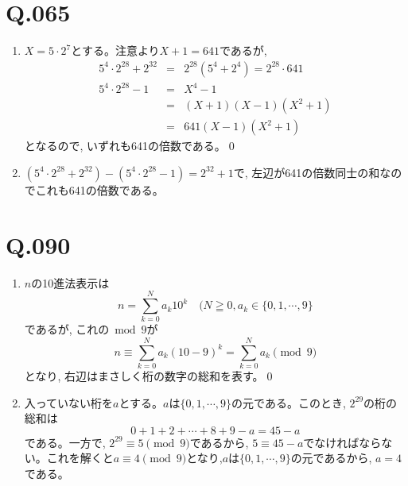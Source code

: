 \documentclass[twocolumn]{jbook}
\theoremstyle{definition}
\newcommand{\disp}{\displaystyle}
\newcommand{\ben}{\begin{enumerate}}
\newcommand{\een}{\end{enumerate}}
\newcommand{\beqn}{\begin{eqnarray*}}
\newcommand{\eeqn}{\end{eqnarray*}}
\renewcommand{\geq}{\geqq}
\begin{document}
\section*{Q.065}
\ben
\item $X=5\cdot 2^{7}$とする。注意より$X+1=641$であるが, 
\beqn
5^{4}\cdot 2^{28} + 2^{32} &=& 2^{28}(5^4+2^4)=2^{28}\cdot 641\\
5^{4}\cdot 2^{28}-1 &=& X^4-1 \\
&=& (X+1)(X-1)(X^2+1)\\
&=&641(X-1)(X^2+1)
\eeqn
となるので, いずれも641の倍数である。\qed
\item $(5^4\cdot 2^{28}+2^{32}) - (5^4\cdot 2^{28} -1) = 2^{32}+1$で, 左辺が641の倍数同士の和なのでこれも641の倍数である。
\een

\section*{Q.090}
\ben
\item $n$の10進法表示は
\[n=\disp\sum_{k=0}^{N}a_k10^{k} \quad (N\geq 0, a_k\in \{0,1,\cdots, 9 \}\]
であるが, これの$\bmod{9}$が
\[n\equiv \disp\sum_{k=0}^{N}a_k(10-9)^{k} = \disp\sum_{k=0}^{N} a_k \pmod{9}\]
となり, 右辺はまさしく桁の数字の総和を表す。\qed
\item 入っていない桁を$a$とする。$a$は$\{ 0,1,\cdots, 9\}$の元である。このとき, $2^{29}$の桁の総和は
\[0+1+2+\cdots + 8+9 - a= 45-a\]
である。一方で, $2^{29}\equiv 5 \pmod{9}$であるから, $5\equiv 45-a$でなければならない。これを解くと$a\equiv 4\pmod{9}$となり,$a$は$\{ 0,1,\cdots, 9\}$の元であるから, $a=4$である。
\een

\clearpage
\end{document}
